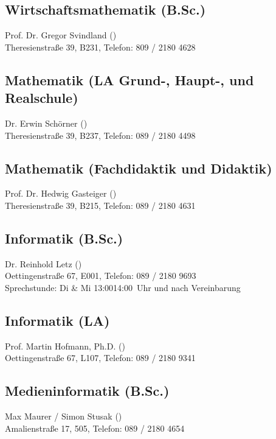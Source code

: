 \subsection*{Wirtschaftsmathematik (B.Sc.)\subjectList{\subjectW}}
Prof. Dr. Gregor Svindland ()\\
Theresienstraße 39, B231, Telefon: 809 / 2180 \emd{} 4628

\subsection*{Mathematik (LA Grund-, Haupt-, und Realschule)\subjectList{\subjectM}}
Dr. Erwin Schörner ()\\
Theresienstraße 39, B237, Telefon: 089 / 2180 \emd{} 4498

\subsection*{Mathematik (Fachdidaktik und Didaktik)\subjectList{\subjectM}}
Prof. Dr. Hedwig Gasteiger ()\\ %
Theresienstraße 39, B215, Telefon: 089 / 2180 \emd{} 4631

\subsection*{Informatik (B.Sc.)\subjectList{\subjectI}}
Dr. Reinhold Letz ()\\
Oettingenstraße 67, E001, Telefon: 089 / 2180 \emd{} 9693\\
Sprechstunde: Di \& Mi 13:00\emd{}14:00~Uhr und nach Vereinbarung

\subsection*{Informatik (LA)\subjectList{\subjectI}}
Prof. Martin Hofmann, Ph.D. ()\\
Oettingenstraße 67, L107, Telefon: 089 / 2180 \emd{} 9341

\subsection*{Medieninformatik (B.Sc.)\subjectList{\subjectMI}}
Max Maurer / Simon Stusak ()\\
Amalienstraße 17, 505, Telefon: 089 / 2180 \emd{} 4654

